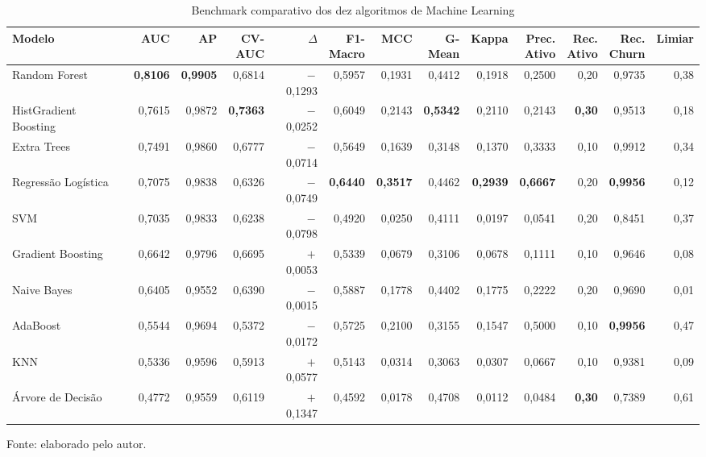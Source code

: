 \begin{table}[htbp]
\ABNTEXfontereduzida
\SingleSpacing
\caption{Benchmark comparativo dos dez algoritmos de Machine Learning}
\label{tab:benchmark}
\centering
\scriptsize
\setlength{\tabcolsep}{1.3pt}
\begin{tabular}{@{}>{\raggedright\arraybackslash}p{2.3cm}rrrrrrrrrrrr@{}}
\hline
\textbf{Modelo} & \textbf{AUC} & \textbf{AP} & \shortstack[r]{\textbf{CV-}\\\textbf{AUC}} & \textbf{$\Delta$} & \shortstack[r]{\textbf{F1-}\\\textbf{Macro}} & \textbf{MCC} & \shortstack[r]{\textbf{G-}\\\textbf{Mean}} & \textbf{Kappa} & \shortstack[r]{\textbf{Prec.}\\\textbf{Ativo}} & \shortstack[r]{\textbf{Rec.}\\\textbf{Ativo}} & \shortstack[r]{\textbf{Rec.}\\\textbf{Churn}} & \textbf{Limiar} \\
\hline
Random Forest & \textbf{0,8106} & \textbf{0,9905} & 0,6814 & $-$\,0,1293 & 0,5957 & 0,1931 & 0,4412 & 0,1918 & 0,2500 & 0,20 & 0,9735 & 0,38 \\
HistGradient Boosting & 0,7615 & 0,9872 & \textbf{0,7363} & $-$\,0,0252 & 0,6049 & 0,2143 & \textbf{0,5342} & 0,2110 & 0,2143 & \textbf{0,30} & 0,9513 & 0,18 \\
Extra Trees & 0,7491 & 0,9860 & 0,6777 & $-$\,0,0714 & 0,5649 & 0,1639 & 0,3148 & 0,1370 & 0,3333 & 0,10 & 0,9912 & 0,34 \\
Regressão Logística & 0,7075 & 0,9838 & 0,6326 & $-$\,0,0749 & \textbf{0,6440} & \textbf{0,3517} & 0,4462 & \textbf{0,2939} & \textbf{0,6667} & 0,20 & \textbf{0,9956} & 0,12 \\
SVM & 0,7035 & 0,9833 & 0,6238 & $-$\,0,0798 & 0,4920 & 0,0250 & 0,4111 & 0,0197 & 0,0541 & 0,20 & 0,8451 & 0,37 \\
Gradient Boosting & 0,6642 & 0,9796 & 0,6695 & $+$\,0,0053 & 0,5339 & 0,0679 & 0,3106 & 0,0678 & 0,1111 & 0,10 & 0,9646 & 0,08 \\
Naive Bayes & 0,6405 & 0,9552 & 0,6390 & $-$\,0,0015 & 0,5887 & 0,1778 & 0,4402 & 0,1775 & 0,2222 & 0,20 & 0,9690 & 0,01 \\
AdaBoost & 0,5544 & 0,9694 & 0,5372 & $-$\,0,0172 & 0,5725 & 0,2100 & 0,3155 & 0,1547 & 0,5000 & 0,10 & \textbf{0,9956} & 0,47 \\
KNN & 0,5336 & 0,9596 & 0,5913 & $+$\,0,0577 & 0,5143 & 0,0314 & 0,3063 & 0,0307 & 0,0667 & 0,10 & 0,9381 & 0,09 \\
Árvore de Decisão & 0,4772 & 0,9559 & 0,6119 & $+$\,0,1347 & 0,4592 & 0,0178 & 0,4708 & 0,0112 & 0,0484 & \textbf{0,30} & 0,7389 & 0,61 \\
\hline
\end{tabular}
\begin{flushleft}
	\ABNTEXfontereduzida
	\SingleSpacing
	Fonte: elaborado pelo autor.


\end{flushleft}
\end{table}
